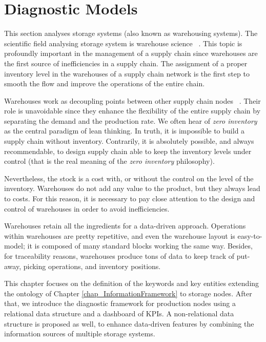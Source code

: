 \chapter{Diagnostic Models}

This section analyses storage systems (also known as warehousing systems). The scientific field analysing storage system is warehouse science ~\cite{Bartholdi2017}. This topic is profoundly important in the management of a supply chain since warehouses are the first source of inefficiencies in a supply chain. The assignment of a proper inventory level in the warehouses of a supply chain network is the first step to smooth the flow and improve the operations of the entire chain.\par

Warehouses work as decoupling points between other supply chain nodes ~\cite{Aguezzoul2014, Selviaridis2007}. Their role is unavoidable since they enhance the flexibility of the entire supply chain by separating the demand and the production rate. We often hear of \textit{zero inventory} as the central paradigm of lean thinking. In truth, it is impossible to build a supply chain without inventory. Contrarily, it is absolutely possible, and always recommendable, to design supply chain able to keep the inventory levels under control (that is the real meaning of the \textit{zero inventory} philosophy). \par

Nevertheless, the stock is a cost with, or without the control on the level of the inventory. Warehouses do not add any value to the product, but they always lead to costs. For this reason, it is necessary to pay close attention to the design and control of warehouses in order to avoid inefficiencies.\par

Warehouses retain all the ingredients for a data-driven approach. Operations within warehouses are pretty repetitive, and even the warehouse layout is easy-to-model; it is composed of many standard blocks working the same way. Besides, for traceability reasons, warehouses produce tons of data to keep track of put-away, picking operations, and inventory positions.\par

This chapter focuses on the definition of the keywords and key entities extending the ontology of Chapter \ref{chap_InformationFramework} to storage nodes. After that, we introduce the diagnostic framework for production nodes using a relational data structure and a dashboard of KPIs. A non-relational data structure is proposed as well, to enhance data-driven features by combining the information sources of multiple storage systems.\par

